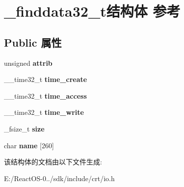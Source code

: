 \hypertarget{struct__finddata32__t}{}\section{\+\_\+finddata32\+\_\+t结构体 参考}
\label{struct__finddata32__t}
\subsection*{Public 属性}
\begin{DoxyCompactItemize}
\item 
\mbox{\label{struct__finddata32__t_a434ec93235018e14bd1b179626ac3b25}} 
unsigned {\bfseries attrib}
\item 
\mbox{\label{struct__finddata32__t_a776c93af4936d05a79918133f3e2eab8}} 
\+\_\+\+\_\+time32\+\_\+t {\bfseries time\+\_\+create}
\item 
\mbox{\label{struct__finddata32__t_a45e3b4eb94bd8bacbea9cde79e5af31b}} 
\+\_\+\+\_\+time32\+\_\+t {\bfseries time\+\_\+access}
\item 
\mbox{\label{struct__finddata32__t_a5eed18089214083a358cf488c59f8423}} 
\+\_\+\+\_\+time32\+\_\+t {\bfseries time\+\_\+write}
\item 
\mbox{\label{struct__finddata32__t_a87d3df97a9efcdd50738174edffde428}} 
\+\_\+fsize\+\_\+t {\bfseries size}
\item 
\mbox{\label{struct__finddata32__t_a970c82bb1bf6009562a56d7db3ec9597}} 
char {\bfseries name} \mbox{[}260\mbox{]}
\end{DoxyCompactItemize}


该结构体的文档由以下文件生成\+:\begin{DoxyCompactItemize}
\item 
E\+:/\+React\+O\+S-\/0../sdk/include/crt/io.\+h\end{DoxyCompactItemize}
